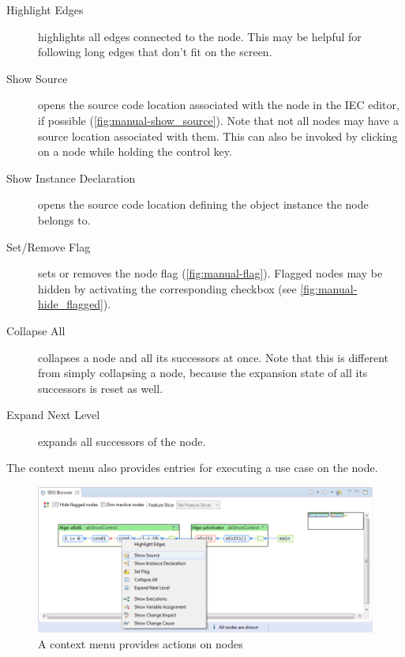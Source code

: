 \begin{description}
  \item[Highlight Edges] highlights all edges connected to the node. This may be   helpful for following long edges 
  that don't fit on the screen.
  
  \item[Show Source] opens the source code location associated with the node in the IEC editor, if possible 
  (\autoref{fig:manual-show_source}). Note that not all nodes may have a source location associated with them. This can 
  also be invoked by clicking on a node while holding the control key.
  
  \item[Show Instance Declaration] opens the source code location defining the object instance the node belongs to.
  
  \item[Set/Remove Flag] sets or removes the node flag (\autoref{fig:manual-flag}). Flagged nodes may be hidden by 
  activating the corresponding checkbox (see \autoref{fig:manual-hide_flagged}).
  
  \item[Collapse All] collapses a node and all its successors at once. Note that this is different from simply 
  collapsing a node, because the expansion state of all its successors is reset as well.
  
  \item[Expand Next Level] expands all successors of the node.
\end{description}

The context menu also provides entries for executing a use case on the node.

\begin{figure}[p]
  \centering
    \includegraphics[width=\textwidth]{bilder/manual-node_context}
  \caption{A context menu provides actions on nodes}
  \label{fig:manual-node_context}
\end{figure}


